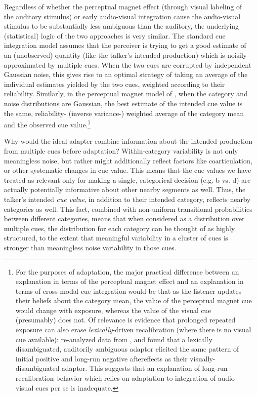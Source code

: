Regardless of whether the perceptual magnet effect (through visual labeling of the auditory stimulus) or early audio-visual integration cause the audio-visual stimulus to be substantially less ambiguous than the auditory, the underlying (statistical) logic of the two approaches is very similar.  The standard cue integration model \cite{Ernst2002} assumes that the perceiver is trying to get a good estimate of an (unobserved) quantity (like the talker's intended production) which is noisily approximated by multiple cues.  When the two cues are corrupted by independent Gaussian noise, this gives rise to an optimal strategy of taking an average of the individual estimates yielded by the two cues, weighted according to their reliability.  Similarly, in the perceptual magnet model of , when the category and noise distributions are Gaussian, the best estimate of the intended cue value is the same, reliability- (inverse variance-) weighted average of the category mean and the observed cue value.\footnote{For the purposes of adaptation, the major practical difference between an explanation in terms of the perceptual magnet effect and an explanation in terms of cross-modal cue integration would be that as the listener updates their beliefs about the category mean, the value of the perceptual magnet cue would change with exposure, whereas the value of the visual cue (presumably) does not.
Of relevance is evidence that prolonged repeated exposure can also erase \emph{lexically}-driven recalibration (where there is no visual cue available):  re-analyzed data from , and found that a lexically disambiguated, auditorily ambiguous adaptor  elicited the same pattern of initial positive and long-run negative aftereffects as their visually-disambiguated adaptor. This suggests that an explanation of long-run recalibration behavior which relies on adaptation to integration of audio-visual cues per se is inadequate.}

Why would the ideal adapter combine information about the intended production from multiple cues before adaptation?  Within-category variability is not only meaningless noise, but rather might additionally reflect factors like coarticulation, or other systematic changes in cue value.  This means that the cue values we have treated as relevant only for making a single, categorical decision (e.g. \ph b vs. \ph d) are actually potentially informative about other nearby segments as well.  Thus, the talker's intended \emph{cue value}, in addition to their intended category, reflects nearby categories as well.  This fact, combined with non-uniform transitional probabilities between different categories, means that when considered as a distribution over multiple cues, the distribution for each category can be thought of as highly structured, to the extent that meaningful variability in a cluster of cues is stronger than meaningless noise variability in those cues.

